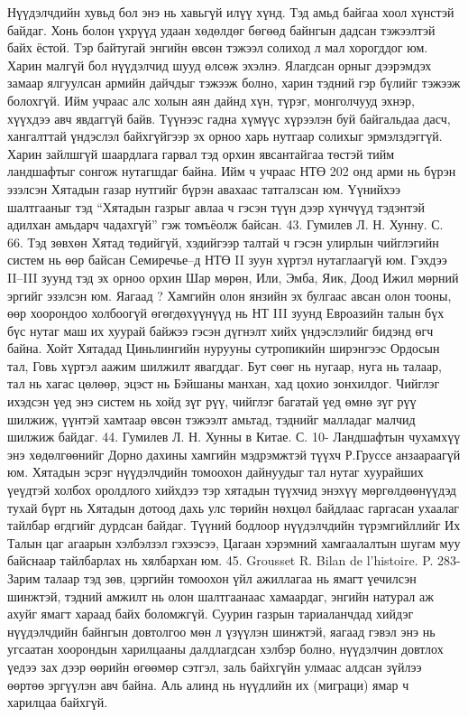 Нүүдэлчдийн хувьд бол энэ нь хавьгүй илүү хүнд. Тэд амьд байгаа хоол хүнстэй байдаг. Хонь болон үхрүүд удаан хөдөлдөг бөгөөд байнгын дадсан тэжээлтэй байх ёстой. Тэр байтугай энгийн өвсөн тэжээл солиход л мал хорогддог юм. Харин малгүй бол нүүдэлчид шууд өлсөж эхэлнэ. Ялагдсан орныг дээрэмдэх замаар ялгуулсан армийн дайчдыг тэжээж болно, харин тэдний гэр бүлийг тэжээж болохгүй. Ийм учраас алс холын аян дайнд хүн, түрэг, монголчууд эхнэр, хүүхдээ авч явдаггүй байв. Түүнээс гадна хүмүүс хүрээлэн буй байгальдаа дасч, хангалттай үндэслэл байхгүйгээр эх орноо харь нутгаар солихыг эрмэлздэггүй. Харин зайлшгүй шаардлага гарвал тэд орхин явсантайгаа төстэй тийм ландшафтыг сонгож нутагшдаг байна. Ийм ч учраас НТӨ 202 онд арми нь бүрэн эзэлсэн Хятадын газар нутгийг бүрэн авахаас татгалзсан юм. Үүнийхээ шалтгааныг тэд “Хятадын газрыг авлаа ч гэсэн түүн дээр хүнчүүд тэдэнтэй адилхан амьдарч чадахгүй” гэж томъёолж байсан. 43. Гумилев Л. Н. Хунну. С. 66.
Тэд зөвхөн Хятад төдийгүй, хэдийгээр талтай ч гэсэн улирлын чийглэгийн систем нь өөр байсан Семиречье–д НТӨ II зуун хүртэл нутаглаагүй юм. Гэхдээ II–III зуунд тэд эх орноо орхин Шар мөрөн, Или, Эмба, Яик, Доод Ижил мөрний эргийг эзэлсэн юм. Яагаад ?
Хамгийн олон янзийн эх булгаас авсан олон тооны, өөр хоорондоо холбоогүй өгөгдөхүүнүүд нь НТ III зуунд Евроазийн талын бүх бүс нутаг маш их хуурай байжээ гэсэн дүгнэлт хийх үндэслэлийг бидэнд өгч байна. Хойт Хятадад Циньлингийн нурууны сутропикийн ширэнгээс Ордосын тал, Говь хүртэл аажим шилжилт явагддаг. Бут сөөг нь нугаар, нуга нь талаар, тал нь хагас цөлөөр, эцэст нь Бэйшаны манхан, хад цохио зонхилдог. Чийглэг ихэдсэн үед энэ систем нь хойд зүг рүү, чийглэг багатай үед өмнө зүг рүү шилжиж, үүнтэй хамтаар өвсөн тэжээлт амьтад, тэднийг малладаг малчид шилжиж байдаг. 44. Гумилев Л. Н. Хунны в Китае. С. 10-
Ландшафтын чухамхүү энэ хөдөлгөөнийг Дорно дахины хамгийн мэдрэмжтэй түүхч Р.Груссе анзаараагүй юм. Хятадын эсрэг нүүдэлчдийн томоохон дайнуудыг тал нутаг хуурайших үеүдтэй холбох оролдлого хийхдээ тэр хятадын түүхчид энэхүү мөргөлдөөнүүдэд тухай бүрт нь Хятадын дотоод дахь улс төрийн нөхцөл байдлаас гаргасан ухаалаг тайлбар өгдгийг дурдсан байдаг. Түүний бодлоор нүүдэлчдийн түрэмгийллийг Их Талын цаг агаарын хэлбэлзэл гэхээсээ, Цагаан хэрэмний хамгаалалтын шугам муу байснаар тайлбарлах нь хялбархан юм. 45. Grousset R. Bilan de l’histoire. P. 283-
Зарим талаар тэд зөв, цэргийн томоохон үйл ажиллагаа нь ямагт үечилсэн шинжтэй, тэдний амжилт нь олон шалтгаанаас хамаардаг, энгийн натурал аж ахуйг ямагт хараад байх боломжгүй. Суурин газрын тариаланчдад хийдэг нүүдэлчдийн байнгын довтолгоо мөн л үзүүлэн шинжтэй, яагаад гэвэл энэ нь угсаатан хоорондын харилцааны далдлагдсан хэлбэр болно, нүүдэлчин довтлох үедээ зах дээр өөрийн өгөөмөр сэтгэл, заль байхгүйн улмаас алдсан зүйлээ өөртөө эргүүлэн авч байна. Аль алинд нь нүүдлийн их (миграци) ямар ч харилцаа байхгүй.
